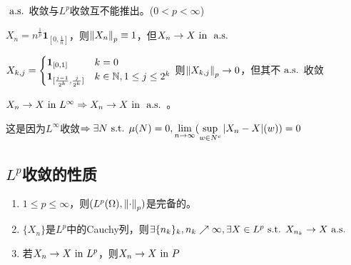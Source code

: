 \documentclass{ctexart}
\begin{document}
  \begin{Eg}
    $\text{ a.s. }$收敛与$L^{p}$收敛互不能推出。($0<p<\infty$)

    $X_{n}=n^{\frac 1 p}\bm 1_{[0,\frac 1 n]}$，则$\left\|X_{n}\right\|_{p}\equiv 1$，但$X_{n}\to X\text{ in }\text{ a.s. }$

    $X_{k,j}=
    \begin{cases}
      \bm 1_{[0,1]}& k=0\\ \bm{1}_{[\frac{j-1}{2^{k}},\frac{j}{2^{k}}]} &k\in\mathbb{N}, 1\leq j\leq 2^{k}
    \end{cases}
    $
    则$\left\|X_{k,j}\right\|_{p}\to 0$，但其不$\text{ a.s. }$收敛
  \end{Eg}

  \begin{Eg}
    $X_{n}\to X\text{ in } L^{\infty}\Rightarrow X_{n}\to X\text{ in } \text{ a.s. }$。

    这是因为$L^{\infty}$收敛$\Rightarrow \exists N\text{ s.t. } \mu(N)=0,\lim\limits_{n\to\infty}(\sup\limits_{w\in N^{c}}|X_{n}-X|(w))=0$
  \end{Eg}


\subsection{$L^p$收敛的性质}
\begin{Thm}
  \begin{enumerate}
  \item $1\leq p\leq \infty$，则$(L^{p}(\Omega),\left\|\cdot\right\|_{p})$是完备的。
  \item $\{X_{n}\}$是$L^{p}$中的Cauchy列，则$\exists \{n_{k}\}_{k},n_{k}\nearrow \infty,\exists X\in L^{p}\text{ s.t. } X_{n_{k}}\to X\text{ a.s. }$
  \item 若$X_{n}\to X\text{ in } L^{p}$，则$X_{n}\to X\text{ in } P$
  \end{enumerate}
  \end{Thm}
\end{document}
